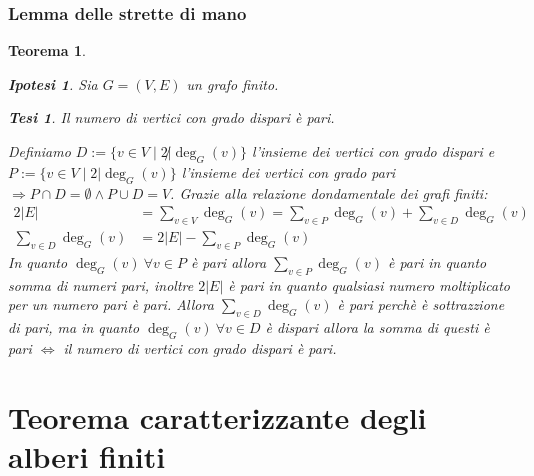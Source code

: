 \documentclass{article}
\makeatletter
\renewenvironment{proof}[1][\proofname]{\par
    \pushQED{\qed}%
    \normalfont \topsep6\p@\@plus6\p@\relax
    \trivlist
    \item\relax
    {\itshape
    #1\@addpunct{.}}\hspace\labelsep\ignorespaces
    }{%
    \popQED\endtrivlist\@endpefalse
}
\newtheorem{theorem}{Teorema}[part]
\newtheorem{ipothesis}[lemma]{Ipotesi}
\newtheorem{thesis}[lemma]{Tesi}
\makeatother
\begin{document}
    \section{Lemma delle strette di mano}
        \begin{theorem}
            \begin{ipothesis}
                Sia \(G=(V,E)\) un grafo finito.
            \end{ipothesis}
            \begin{thesis}
                Il numero di vertici con grado dispari è pari.
            \end{thesis}
            \begin{proof}
                Definiamo \(D:=\{v\in V\mid 2\not|\deg_G(v)\}\) l'insieme dei vertici con grado dispari e \(P:=\{v\in V\mid 2|\deg_G(v)\}\) l'insieme dei vertici con grado pari \(\Rightarrow P\cap D=\emptyset\land P\cup D=V\).
                Grazie alla relazione dondamentale dei grafi finiti:
                \[
                    \begin{aligned}
                        2|E|&=\sum_{v\in V}\deg_G(v)=\sum_{v\in P}\deg_G(v)+\sum_{v\in D}\deg_G(v)\\
                        \sum_{v\in D}\deg_G(v)&=2|E|-\sum_{v\in P}\deg_G(v)
                    \end{aligned}
                \]
                In quanto \(\deg_G(v)\ \forall v\in P\) è pari allora \(\sum_{v\in P}\deg_G(v)\) è pari in quanto somma di numeri pari, inoltre \(2|E|\) è pari in quanto qualsiasi numero moltiplicato per un numero pari è pari. Allora \(\sum_{v\in D}\deg_G(v)\) è pari perchè è sottrazzione di pari, ma in quanto \(\deg_G(v)\ \forall v\in D\) è dispari allora la somma di questi è pari \(\Leftrightarrow\) il numero di vertici con grado dispari è pari.
                \pushQED{}
            \end{proof}
            \raggedleft{{\ensuremath{\blacksquare}}}
        \end{theorem}
\part{Teorema caratterizzante degli alberi finiti}
\end{document}
